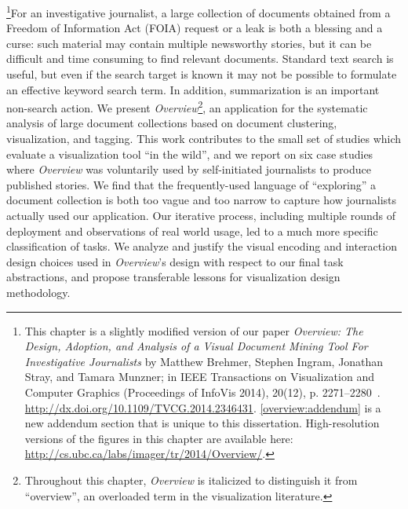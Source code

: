 \footnote{This chapter is a slightly modified version of our paper {\it Overview: The Design, Adoption, and Analysis of a Visual Document Mining Tool For Investigative Journalists} by Matthew Brehmer, Stephen Ingram, Jonathan Stray, and Tamara Munzner; in IEEE Transactions on Visualization and Computer Graphics (Proceedings of InfoVis 2014), 20(12), p. 2271--2280~\cite{Brehmer2014}. \url{http://dx.doi.org/10.1109/TVCG.2014.2346431}. \autoref{overview:addendum} is a new addendum section that is unique to this dissertation. High-resolution versions of the figures in this chapter are available here: \url{http://cs.ubc.ca/labs/imager/tr/2014/Overview/}.}For an investigative journalist, a large collection of documents obtained from a Freedom of Information Act (FOIA) request or a leak is both a blessing and a curse: such material may contain multiple newsworthy stories, but it can be difficult and time consuming to find relevant documents.
Standard text search is useful, but even if the search target is known it may not be possible to formulate an effective keyword search term.
In addition, summarization is an important non-search action.
We present {\it Overview}\footnote{Throughout this chapter, {\it Overview} is italicized to distinguish it from ``overview'', an overloaded term in the visualization literature.}, an application for the systematic analysis of large document collections based on document clustering, visualization, and tagging. 
This work contributes to the small set of studies which evaluate a visualization tool ``in the wild'', and we report on six case studies where {\it Overview} was voluntarily used by self-initiated journalists to produce published stories. 
We find that the frequently-used language of ``exploring'' a document collection is both too vague and too narrow to capture how journalists actually used our application. 
Our iterative process, including multiple rounds of deployment and observations of real world usage, led to a much more specific classification of tasks. 
We analyze and justify the visual encoding and interaction design choices used in {\it Overview}'s design with respect to our final task abstractions, and propose transferable lessons for visualization design methodology.

